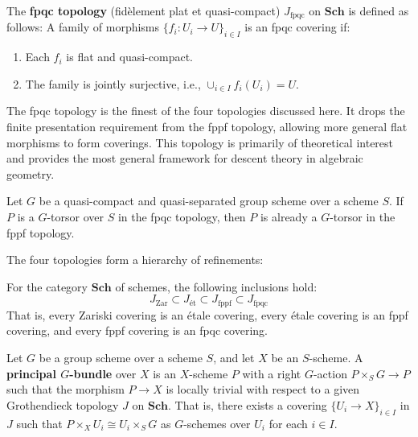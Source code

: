 \documentclass[12pt]{article}
\begin{document}
\begin{definition}
    The \textbf{fpqc topology} (fidèlement plat et quasi-compact) $J_{\textrm{fpqc}}$ on $\mathbf{Sch}$ is defined as follows: A family of morphisms $\{f_i: U_i \to U\}_{i \in I}$ is an fpqc covering if:
    \begin{enumerate}
        \item Each $f_i$ is flat and quasi-compact.
        \item The family is jointly surjective, i.e., $\cup_{i \in I} f_i(U_i) = U$.
    \end{enumerate}
\end{definition}

\begin{remark}
    The fpqc topology is the finest of the four topologies discussed here. It drops the finite presentation requirement from the fppf topology, allowing more general flat morphisms to form coverings. This topology is primarily of theoretical interest and provides the most general framework for descent theory in algebraic geometry.
\end{remark}

\begin{proposition}
    Let $G$ be a quasi-compact and quasi-separated group scheme over a scheme $S$. If $P$ is a $G$-torsor over $S$ in the fpqc topology, then $P$ is already a $G$-torsor in the fppf topology.
\end{proposition}
The four topologies form a hierarchy of refinements:
\begin{theorem}
    For the category $\mathbf{Sch}$ of schemes, the following inclusions hold:
    \[ J_{\textrm{Zar}} \subset J_{\textrm{ét}} \subset J_{\textrm{fppf}} \subset J_{\textrm{fpqc}} \]
    That is, every Zariski covering is an étale covering, every étale covering is an fppf covering, and every fppf covering is an fpqc covering.
\end{theorem}


\begin{definition}
    Let $G$ be a group scheme over a scheme $S$, and let $X$ be an $S$-scheme. A \textbf{principal $G$-bundle} over $X$ is an $X$-scheme $P$ with a right $G$-action $P \times_S G \to P$ such that the morphism $P \to X$ is locally trivial with respect to a given Grothendieck topology $J$ on $\mathbf{Sch}$. That is, there exists a covering $\{U_i \to X\}_{i \in I}$ in $J$ such that $P \times_X U_i \cong U_i \times_S G$ as $G$-schemes over $U_i$ for each $i \in I$.
\end{definition}
\end{document}
